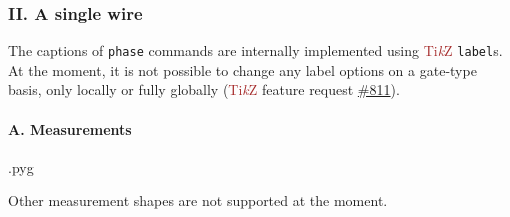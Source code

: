 \documentclass{scrartcl}
\makeatletter
\newenvironment{codeexample}{%
   \VerbatimEnvironment%
   \let\FVB@VerbatimOut\minted@FVB@VerbatimOut
   \let\FVE@VerbatimOut\minted@FVE@VerbatimOut
   \minted@configlang{tex}%
   \minted@fvset
   \begin{VerbatimOut}[codes={\catcode`\^^I=12},firstline,lastline]{\minted@jobname.pyg}%
}{
   \end{VerbatimOut}%
   \minted@langlinenoson%
   \savebox\codeexamplebox{ \minted@jobname.pyg}%
   \ifdim\wd\codeexamplebox>\dimexpr.5\linewidth-3mm\relax%
      \wd\codeexamplebox=.5\linewidth%
   \else%
      \wd\codeexamplebox=\dimexpr\wd\codeexamplebox+3mm\relax%
   \fi%
   \noindent\begin{minipage}{\wd\codeexamplebox}%
      \centering%
      \usebox\codeexamplebox%
   \end{minipage}%
   \begin{minipage}{\dimexpr\linewidth-\wd\codeexamplebox\relax}%
      \expandafter\minted@pygmentize\expandafter{\minted@lang}%
   \end{minipage}%
   \minted@langlinenosoff%
   \par%
}
\newenvironment{codeexample*}{%
   \VerbatimEnvironment%
   \let\FVB@VerbatimOut\minted@FVB@VerbatimOut
   \let\FVE@VerbatimOut\minted@FVE@VerbatimOut
   \minted@configlang{tex}%
   \minted@fvset
   \begin{VerbatimOut}[codes={\catcode`\^^I=12},firstline,lastline]{\minted@jobname.pyg}%
}{
   \end{VerbatimOut}%
   \minted@langlinenoson%
   \begin{adjustbox}{center}
       \minted@jobname.pyg %
   \end{adjustbox}\nopagebreak
   \expandafter\minted@pygmentize\expandafter{\minted@lang}%
   \minted@langlinenosoff%
   \par%
}
\def\TikZ{\textcolor{brown}{Ti\textit kZ}}
\def\ttlink{\link\texttt}
\makeatother
\begin{document}
         \subsubsection{II. A single wire}
            \begin{example}
               \begin{codeexample*}
               \end{codeexample*}
               The captions of \ttlink{phase} commands are internally implemented using \TikZ{} \texttt{label}s.
               At the moment, it is not possible to change any label options on a gate-type basis, only locally or fully globally (\TikZ{} feature request \href{https://github.com/pgf-tikz/pgf/issues/811}{\#811}).
            \end{example}

            \clearpage
            \paragraph{A. Measurements}\leavevmode
               \begin{example}
                  \begin{codeexample}
                  \end{codeexample}
                  Other measurement shapes are not supported at the moment.
               \end{example}
\end{document}
